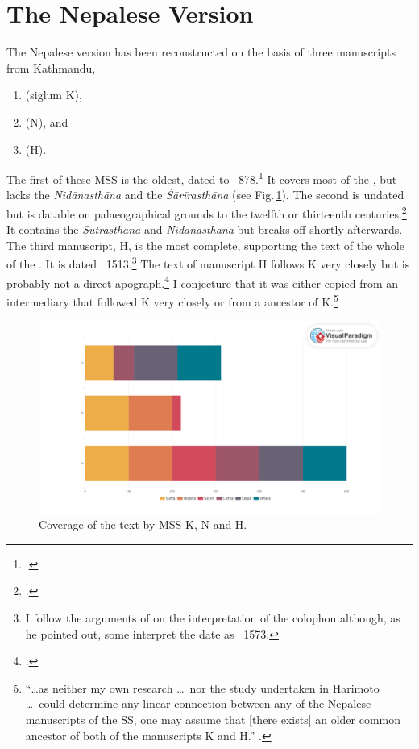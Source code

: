    
\section{The Nepalese Version}    

The Nepalese version has been reconstructed on the basis of three
manuscripts from Kathmandu,
    \begin{enumerate}
        \item {} (siglum K),
        \item {} (N), and
        \item {} (H).
    \end{enumerate}
The first of these MSS is the oldest, dated to
\CE~878.\footcite[15]{kleb-2021b}  It covers most of the \SS, but
lacks the \emph{Nidānasthāna} and the \emph{Śārīrasthāna} (see
Fig.\,\ref{fig:mss-1-visual-paradigm}).  The second is undated but is
datable on palaeographical grounds to the twelfth or thirteenth
centuries.\footcite[17--18]{kleb-2021b} It contains the
\emph{Sūtrasthāna} and \emph{Nidānasthāna} but breaks off shortly
afterwards.  The third manuscript, H, is the most complete, supporting
the text of the whole of the \SS. It is dated \CE~1513.\footnote{I
    follow the arguments of \citet[21--26]{kleb-2021b} on the
    interpretation of the colophon although, as he pointed out, some
    interpret the date as \CE\ 1573.} %
    The text of manuscript H follows K very closely but is probably
    not a direct apograph.\footcite{chak-2022} I conjecture that it
    was either copied from an intermediary that followed K very
    closely or from a ancestor of K.\footnote{“\ldots as neither my
        own research \ldots\ nor the study undertaken in Harimoto \ldots\
        could determine any linear connection between any of the Nepalese
        manuscripts of the SS, one may assume that [there exists] an older
        common ancestor of both of the manuscripts K and H.”
        \citep[21]{kleb-2021a}.}
        
        \begin{figure}[t]
            \centering
            \includegraphics[width=\textwidth]{"media/MSS 1 visual paradigm.art"}
            \caption{Coverage of the text by MSS K, N and H.}
            \label{fig:mss-1-visual-paradigm}
        \end{figure}
        
